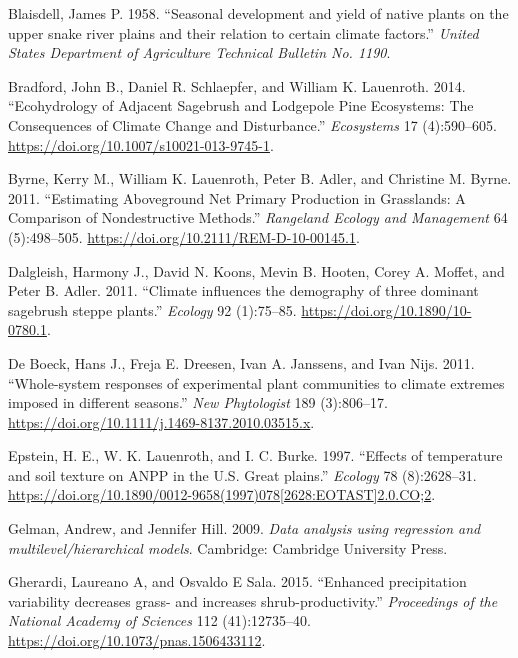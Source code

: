 \documentclass[fleqn,10pt,lineno]{wlpeerj} %
\begin{document}
\leavevmode\hypertarget{ref-Blaisdell1958}{}%
Blaisdell, James P. 1958. ``Seasonal development and yield of native
plants on the upper snake river plains and their relation to certain
climate factors.'' \emph{United States Department of Agriculture
Technical Bulletin No. 1190}.

\leavevmode\hypertarget{ref-Bradford2014}{}%
Bradford, John B., Daniel R. Schlaepfer, and William K. Lauenroth. 2014.
``Ecohydrology of Adjacent Sagebrush and Lodgepole Pine Ecosystems: The
Consequences of Climate Change and Disturbance.'' \emph{Ecosystems} 17
(4):590--605. \url{https://doi.org/10.1007/s10021-013-9745-1}.

\leavevmode\hypertarget{ref-Byrne2011}{}%
Byrne, Kerry M., William K. Lauenroth, Peter B. Adler, and Christine M.
Byrne. 2011. ``Estimating Aboveground Net Primary Production in
Grasslands: A Comparison of Nondestructive Methods.'' \emph{Rangeland
Ecology and Management} 64 (5):498--505.
\url{https://doi.org/10.2111/REM-D-10-00145.1}.

\leavevmode\hypertarget{ref-Dalgleish2011}{}%
Dalgleish, Harmony J., David N. Koons, Mevin B. Hooten, Corey A. Moffet,
and Peter B. Adler. 2011. ``Climate influences the demography of three
dominant sagebrush steppe plants.'' \emph{Ecology} 92 (1):75--85.
\url{https://doi.org/10.1890/10-0780.1}.

\leavevmode\hypertarget{ref-DeBoeck2011}{}%
De Boeck, Hans J., Freja E. Dreesen, Ivan A. Janssens, and Ivan Nijs.
2011. ``Whole-system responses of experimental plant communities to
climate extremes imposed in different seasons.'' \emph{New Phytologist}
189 (3):806--17. \url{https://doi.org/10.1111/j.1469-8137.2010.03515.x}.

\leavevmode\hypertarget{ref-Epstein1997}{}%
Epstein, H. E., W. K. Lauenroth, and I. C. Burke. 1997. ``Effects of
temperature and soil texture on ANPP in the U.S. Great plains.''
\emph{Ecology} 78 (8):2628--31.
\href{https://doi.org/10.1890/0012-9658(1997)078\%5B2628:EOTAST\%5D2.0.CO;2}{https://doi.org/10.1890/0012-9658(1997)078{[}2628:EOTAST{]}2.0.CO;2}.

\leavevmode\hypertarget{ref-Gelman2009}{}%
Gelman, Andrew, and Jennifer Hill. 2009. \emph{Data analysis using
regression and multilevel/hierarchical models}. Cambridge: Cambridge
University Press.

\leavevmode\hypertarget{ref-Gherardi2015a}{}%
Gherardi, Laureano A, and Osvaldo E Sala. 2015. ``Enhanced precipitation
variability decreases grass- and increases shrub-productivity.''
\emph{Proceedings of the National Academy of Sciences} 112
(41):12735--40. \url{https://doi.org/10.1073/pnas.1506433112}.
\end{document}
